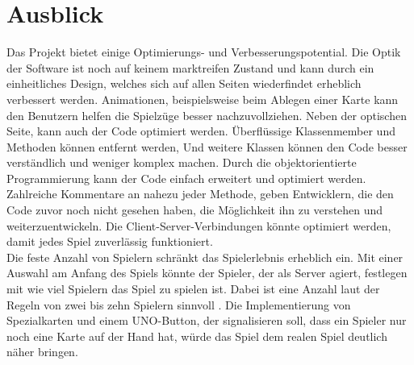 \chapter{Ausblick}
Das Projekt bietet einige Optimierungs- und Verbesserungspotential. Die Optik der Software ist noch auf keinem marktreifen Zustand und kann durch ein einheitliches Design, welches sich auf allen Seiten wiederfindet erheblich verbessert werden. Animationen, beispielsweise beim Ablegen einer Karte kann den Benutzern helfen die Spielzüge besser nachzuvollziehen. Neben der optischen Seite, kann auch der Code optimiert werden. Überflüssige Klassenmember und Methoden können entfernt werden, Und weitere Klassen können den Code besser verständlich und weniger komplex machen. Durch die objektorientierte Programmierung kann der Code einfach erweitert und optimiert werden. Zahlreiche Kommentare an nahezu jeder Methode, geben Entwicklern, die den Code zuvor noch nicht gesehen haben, die Möglichkeit ihn zu verstehen und weiterzuentwickeln. Die Client-Server-Verbindungen könnte optimiert werden, damit jedes Spiel zuverlässig funktioniert.\\
Die feste Anzahl von Spielern schränkt das Spielerlebnis erheblich ein. Mit einer Auswahl am Anfang des Spiels könnte der Spieler, der als Server agiert, festlegen mit wie viel Spielern das Spiel zu spielen ist. Dabei ist eine Anzahl laut der Regeln von zwei bis zehn Spielern sinnvoll \cite{Mattel}. Die Implementierung von Spezialkarten und einem UNO-Button, der signalisieren soll, dass ein Spieler nur noch eine Karte auf der Hand hat, würde das Spiel dem realen Spiel deutlich näher bringen. 